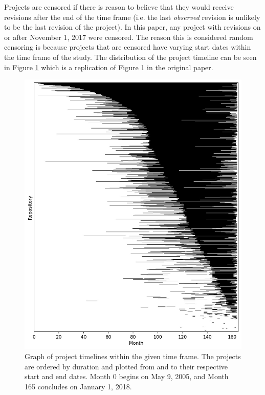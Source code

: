 \documentclass[acmconf]{acmart}
\begin{document}
Projects are censored if there is reason to believe that they would receive revisions after the end of the time frame (i.e. the last \emph{observed} revision is unlikely to be the last revision of the project).
In this paper, any project with revisions on or after November 1, 2017 were censored. 
The reason this is considered random censoring is because projects that are censored have varying start dates within the time frame of the study.
The distribution of the project timeline can be seen in Figure \ref{fig:figure-1} which is a replication of Figure 1 in the original paper.

\begin{figure}[ht]
\centering
\includegraphics[scale=0.5]{figure1.jpg}
\caption{Graph of project timelines within the given time frame. The projects are ordered by duration and plotted from and to their respective start and end dates. Month 0 begins on May 9, 2005, and Month 165 concludes on January 1, 2018.}
\label{fig:figure-1}
\end{figure}
\end{document}
